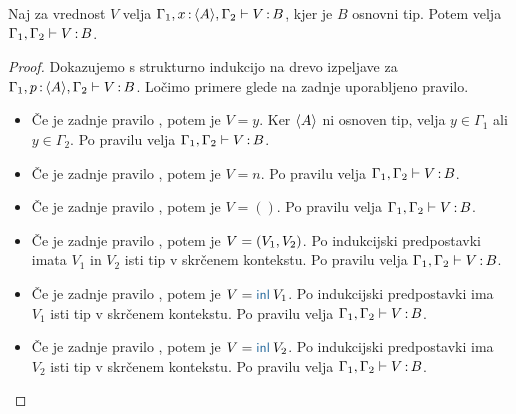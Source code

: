 \begin{lema}\label{lem:tovor-osnovni-tip-skrcitev}
	Naj za vrednost $V$ velja $\Gamma_1, x \mathinner{:} \langle A \rangle, \Gamma_2 \vdash V \mathinner{:} B$, kjer je $B$ osnovni tip. Potem velja $\Gamma_1, \Gamma_2 \vdash V \mathinner{:} B$.
\end{lema}

\begin{proof}
	Dokazujemo s strukturno indukcijo na drevo izpeljave za $\Gamma_1, p \mathinner{:} \langle A \rangle, \Gamma_2 \vdash V \mathinner{:} B$.
	Ločimo primere glede na zadnje uporabljeno pravilo.
	
	\begin{itemize}
		\item[\sitem] Če je zadnje pravilo , potem je $V = y$. Ker $\langle A \rangle$ ni osnoven tip, velja $y \in \Gamma_1$ ali $y \in \Gamma_2$.
		Po pravilu  velja $\Gamma_1, \Gamma_2 \vdash V \mathinner{:} B$.
		
		\item Če je zadnje pravilo , potem je $V = n$. Po pravilu  velja $\Gamma_1, \Gamma_2 \vdash V \mathinner{:} B$.
		
		\item Če je zadnje pravilo , potem je $V = ()$. Po pravilu  velja $\Gamma_1, \Gamma_2 \vdash V \mathinner{:} B$.
		
		\item Če je zadnje pravilo , potem je $V =( V_1 , V_2 )$.
		Po indukcijski predpostavki imata $V_1$ in $V_2$ isti tip v skrčenem kontekstu.
		Po pravilu  velja $\Gamma_1, \Gamma_2 \vdash V \mathinner{:} B$.
		
		
		\item Če je zadnje pravilo , potem je $V = \tminl{V_1}$.
		Po indukcijski predpostavki ima $V_1$ isti tip v skrčenem kontekstu.
		Po pravilu  velja $\Gamma_1, \Gamma_2 \vdash V \mathinner{:} B$.
		
		\item Če je zadnje pravilo , potem je $V = \tminl{V_2}$.
		Po indukcijski predpostavki ima $V_2$ isti tip v skrčenem kontekstu.
		Po pravilu  velja $\Gamma_1, \Gamma_2 \vdash V \mathinner{:} B$.
		

\end{itemize}
\end{proof}
